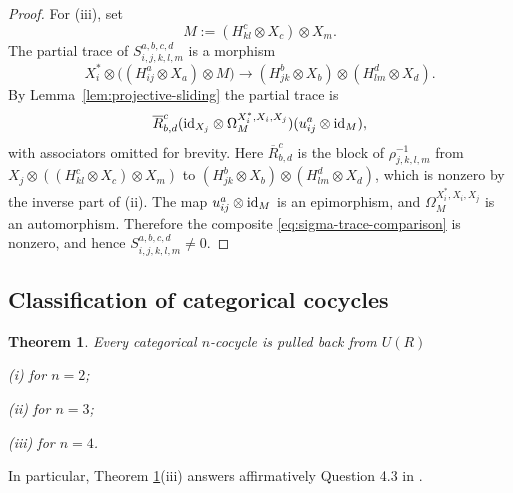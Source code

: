 \documentclass[12pt]{amsart}
\numberwithin{equation}{section}
\newtheorem{theorem}{Theorem}[section]
\theoremstyle{definition}
\newcommand{\1}{_{(1)}}
\newcommand{\2}{_{(2)}}
\newcommand{\3}{_{(3)}}
\newcommand{\4}{_{(4)}}
\newcommand{\5}{_{(5)}}
\newcommand{\6}{_{(6)}}
\theoremstyle{plain}
\theoremstyle{definition}
\theoremstyle{remark}
\begin{document}
\begin{proof}
For (iii), set
\begin{equation*}
        M:=(H^c_{kl}\otimes X_c)\otimes X_m.
\end{equation*}
The partial trace of \(S_{i,j,k,l,m}^{a,b,c,d}\) is a morphism
\begin{equation*}
        X_i^*\otimes\bigl((H^a_{ij}\otimes X_a)\otimes M\bigr)
        \longrightarrow
        (H^b_{jk}\otimes X_b)\otimes(H^d_{lm}\otimes X_d).
\end{equation*}
By Lemma~\ref{lem:projective-sliding} the partial trace is
\begin{equation}
\label{eq:sigma-trace-comparison}
        \overline R^{c}_{b,d}
        ({\rm id}_{X_j}\otimes \Omega^{X_i^*,X_i,X_j}_{M})
        (u^a_{ij}\otimes{\rm id}_{M}),
\end{equation}
with associators omitted for brevity.  Here
\(\overline R^{c}_{b,d}\) is the block of
\(\rho^{-1}_{j,k,l,m}\) from $X_j\otimes((H^c_{kl}\otimes X_c)\otimes X_m)$
to $(H^b_{jk}\otimes X_b)\otimes(H^d_{lm}\otimes X_d)$,
which is nonzero by the inverse part of (ii).  The map
\(u^a_{ij}\otimes{\rm id}_{M}\) is an epimorphism, and
\(\Omega^{X_i^*,X_i,X_j}_{M}\) is an automorphism.
  Therefore the composite
\eqref{eq:sigma-trace-comparison} is nonzero, and hence
\(S_{i,j,k,l,m}^{a,b,c,d}\ne 0\).
\end{proof}

\subsection{Classification of categorical cocycles} 
\begin{theorem}\label{catcoc} Every categorical $n$-cocycle is pulled back from $U(R)$

(i) for $n=2$; 

(ii) for $n=3$; 

(iii) for $n=4$.  
\end{theorem} 

In particular, Theorem \ref{catcoc}(iii) answers affirmatively Question 4.3 in \cite{JOY}. 
\end{document}
